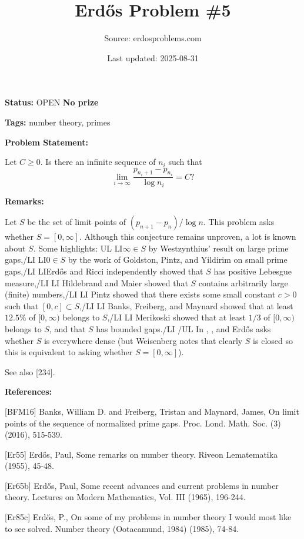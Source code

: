 \documentclass{article}
\title{Erd\H{o}s Problem \#5}
\date{Last updated: 2025-08-31}
\author{Source: erdosproblems.com}
\begin{document}
\maketitle

\noindent\textbf{Status:} OPEN \quad \textbf{No prize}

\noindent\textbf{Tags:} number theory, primes

\medskip
\noindent\textbf{Problem Statement:}

Let $C\geq 0$. Is there an infinite sequence of $n_i$ such that\[\lim_{i\to \infty}\frac{p_{n_i+1}-p_{n_i}}{\log n_i}=C?\]

\bigskip
\noindent\textbf{Remarks:}

Let $S$ be the set of limit points of $(p_{n+1}-p_n)/\log n$. This problem asks whether $S=[0,\infty]$. Although this conjecture remains unproven, a lot is known about $S$. Some highlights:
{UL}
{LI}$\infty\in S$ by Westzynthius' result \cite{We31} on large prime gaps,{/LI}
{LI}$0\in S$ by the work of Goldston, Pintz, and Yildirim \cite{GPY09} on small prime gaps,{/LI}
{LI}Erd\H{o}s \cite{Er55} and Ricci \cite{Ri56} independently showed that $S$ has positive Lebesgue measure,{/LI}
{LI} Hildebrand and Maier \cite{HiMa88} showed that $S$ contains arbitrarily large (finite) numbers,{/LI}
{LI} Pintz \cite{Pi16} showed that there exists some small constant $c>0$ such that $[0,c]\subset S$,{/LI}
{LI} Banks, Freiberg, and Maynard \cite{BFM16} showed that at least $12.5\%$ of $[0,\infty)$ belongs to $S$,{/LI}
{LI} Merikoski \cite{Me20} showed that at least $1/3$ of $[0,\infty)$ belongs to $S$, and that $S$ has bounded gaps.{/LI}
{/UL}
In \cite{Er65b}, \cite{Er85c}, and \cite{Er97c} Erd\H{o}s asks whether $S$ is everywhere dense (but Weisenberg notes that clearly $S$ is closed so this is equivalent to asking whether $S=[0,\infty]$).

See also [234].

\bigskip
\noindent\textbf{References:}

[BFM16] Banks, William D. and Freiberg, Tristan and Maynard, James, On limit points of the sequence of normalized prime gaps. Proc. Lond. Math. Soc. (3) (2016), 515-539.
 
 [Er55] Erd\H{o}s, Paul, Some remarks on number theory. Riveon Lematematika (1955), 45-48.
 
 [Er65b] Erd\H{o}s, Paul, Some recent advances and current problems in number theory. Lectures on Modern Mathematics, Vol. III (1965), 196-244.
 
 [Er85c] Erd\H{o}s, P., On some of my problems in number theory I would most like to see solved. Number theory (Ootacamund, 1984) (1985), 74-84.
 
\end{document}
